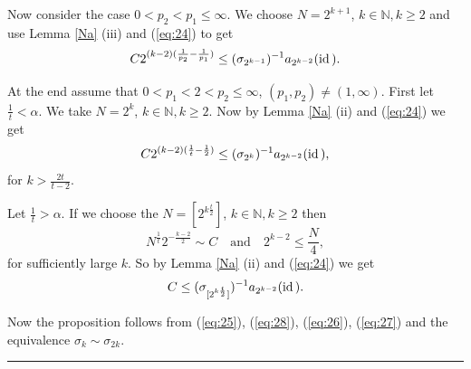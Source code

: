 \documentclass[12pt]{article}
\def\id{\mathop{\rm id \,}\nolimits}
\newcommand{\epr}{\hspace*{\fill}\rule{3mm}{3mm}\\}
\newcommand{\N}{{\mathbb N}}
\begin{document}
Now consider the case $0<p_2<p_1\leq\infty$. We choose $N=2^{k+1}$, $k\in\N, k\geq 2$ and use  Lemma \ref{Na} (iii) and (\ref{eq:24}) to get
\begin{equation}
	C2^{(k-2)(\frac{1}{p_2}-\frac{1}{p_1})}\leq (\sigma_{2^{k-1}})^{-1} a_{2^{k-2}}(\id).
	\label{eq:28}
\end{equation}


At the end assume that  $0< p_1<2< p_2\leq\infty$, $(p_1,p_2)\neq (1,\infty)$. First let  $\frac 1 t<\alpha$. We take $N=2^k$, $k\in\N, k\geq 2$. Now by Lemma \ref{Na} (ii) and  (\ref{eq:24}) we get
\begin{equation}
	C2^{(k-2)(\frac 1 t - \frac 1 2)}\leq (\sigma_{2^k})^{-1} a_{2^{k-2}}(\id),
	\label{eq:26}
\end{equation}
for $k> \frac{2t}{t-2}$.


Let  $\frac 1 t>\alpha$. If we choose the $N=[2^{k\frac t 2}]$, $k\in\N, k\geq 2$ then
\[
N^{\frac 1 t}2^{-\frac{k-2}{2}}\sim C \quad\mathrm{and}\quad 2^{k-2}\leq \frac N 4,
\]
for sufficiently large $k$. So by  Lemma \ref{Na} (ii) and  (\ref{eq:24}) we get
\begin{equation}
	C\leq (\sigma_{[2^{k\frac{t}{2}}]})^{-1} a_{2^{k-2}}(\id).
	\label{eq:27}
\end{equation}

Now the proposition follows from  
(\ref{eq:25}), (\ref{eq:28}), (\ref{eq:26}), (\ref{eq:27}) and  the equivalence  $\sigma_k\sim\sigma_{2k}$.\epr


\end{document}
